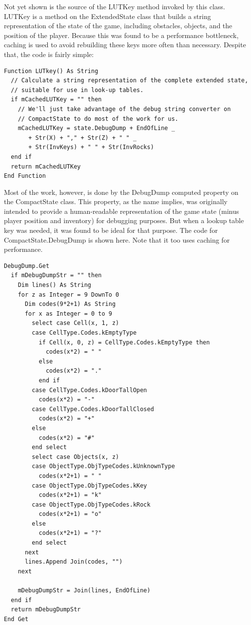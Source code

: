 \documentclass{article}
\begin{document}
Not yet shown is the source of the LUTKey method invoked by this class.  LUTKey is a method on the ExtendedState class that builds a string representation of the state of the game, including obstacles, objects, and the position of the player.  Because this was found to be a performance bottleneck, caching is used to avoid rebuilding these keys more often than necessary.  Despite that, the code is fairly simple:

\begin{lstlisting}
Function LUTkey() As String
  // Calculate a string representation of the complete extended state,
  // suitable for use in look-up tables.
  if mCachedLUTKey = "" then
    // We'll just take advantage of the debug string converter on
    // CompactState to do most of the work for us.
    mCachedLUTKey = state.DebugDump + EndOfLine _
       + Str(X) + "," + Str(Z) + " " _
       + Str(InvKeys) + " " + Str(InvRocks)
  end if
  return mCachedLUTKey  
End Function
\end{lstlisting}

Most of the work, however, is done by the DebugDump computed property on the CompactState class.  This property, as the name implies, was originally intended to provide a human-readable representation of the game state (minus player position and inventory) for debugging purposes.  But when a lookup table key was needed, it was found to be ideal for that purpose.  The code for CompactState.DebugDump is shown here.  Note that it too uses caching for performance.

\begin{lstlisting}
DebugDump.Get
  if mDebugDumpStr = "" then
    Dim lines() As String
    for z as Integer = 9 DownTo 0
      Dim codes(9*2+1) As String
      for x as Integer = 0 to 9
        select case Cell(x, 1, z)
        case CellType.Codes.kEmptyType
          if Cell(x, 0, z) = CellType.Codes.kEmptyType then
            codes(x*2) = " "
          else
            codes(x*2) = "."
          end if
        case CellType.Codes.kDoorTallOpen
          codes(x*2) = "-"
        case CellType.Codes.kDoorTallClosed
          codes(x*2) = "+"
        else
          codes(x*2) = "#"
        end select
        select case Objects(x, z)
        case ObjectType.ObjTypeCodes.kUnknownType
          codes(x*2+1) = " "
        case ObjectType.ObjTypeCodes.kKey
          codes(x*2+1) = "k"
        case ObjectType.ObjTypeCodes.kRock
          codes(x*2+1) = "o"
        else
          codes(x*2+1) = "?"
        end select
      next
      lines.Append Join(codes, "")
    next
    
    mDebugDumpStr = Join(lines, EndOfLine)
  end if
  return mDebugDumpStr
End Get
\end{lstlisting}
\end{document}
